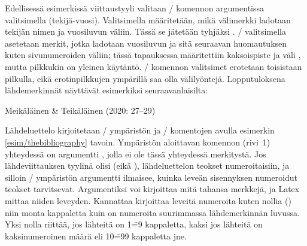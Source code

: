 \begin{koodilohkosis}
\usepackage{natbib}
\end{koodilohkosis}

Edellisessä esimerkissä viittaustyyli valitaan \-/
komennon argumentissa valitsimella 
(tekijä\--vuosi). Valitsimella  määritetään, mikä
välimerkki ladotaan tekijän nimen ja vuosiluvun väliin. Tässä se
jätetään tyhjäksi \koodi{\{\}}. \-/ valitsimella
asetetaan merkit, jotka ladotaan vuosiluvun ja sitä seuraavan
huomautuksen kuten sivunumeroiden väliin; tässä tapauksessa määritettiin
kaksoispiste ja väli \koodi{\{:~\}}, mutta pilkkukin on yleinen
käytäntö. \-/ komennon valitsimet erotetaan
toisistaan pilkulla, eikä erotinpilkkujen ympärillä saa olla
välilyöntejä. Lopputuloksena lähdemerkinnät näyttävät esimerkiksi
seuraavanlaisilta:

\begin{koodilohkosis}
\citet*[27--29]{johdatus} %
\end{koodilohkosis}

\begin{tulossis}
  Meikäläinen \& Teikäläinen (2020: 27--29)
\end{tulossis}

Lähdeluettelo kirjoitetaan \-/ ympäristön ja
\-/ komentojen avulla esimerkin
\ref{esim/thebibliography} tavoin. Ympäristön aloittavan komennon
(rivi~1) yhteydessä on argumentti , jolla ei ole tässä
yhteydessä merkitystä. Jos lähdeviittauksen tyylinä olisi
 (eikä ), lähdeluettelon teokset
numeroitaisiin, ja silloin \-/ ympäristön
argumentti ilmaisee, kuinka leveän sisennyksen numeroidut teokset
tarvitsevat. Argumentiksi voi kirjoittaa mitä tahansa merkkejä, ja Latex
mittaa niiden leveyden. Kannattaa kirjoittaa leveitä numeroita kuten
nollia () niin monta kappaletta kuin on numeroita suurimmassa
lähdemerkinnän luvussa. Yksi nolla riittää, jos lähteitä on 1\==9
kappaletta, kaksi jos lähteitä on kaksinumeroinen määrä eli 10\==99
kappaletta jne.

